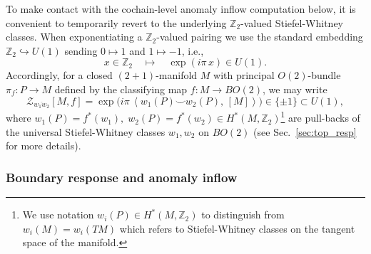 \documentclass[aps,prx,reprint,superscriptaddress,twocolumn,amsmath,amssymb,amsfonts, nofootinbib]{revtex4-2}
\newcommand{\Z}{\mathbb{Z}}
\theoremstyle{apsstyle}
\begin{document}
\medskip

To make contact with the cochain-level anomaly inflow computation below, it is convenient to temporarily revert to the underlying $\Z_2$-valued Stiefel-Whitney classes. When exponentiating a $\Z_2$-valued pairing we use the standard embedding $\Z_2\hookrightarrow U(1)$ sending $0\mapsto 1$ and $1\mapsto -1$, i.e.,
\begin{equation*}
x\in \Z_2
\quad\longmapsto\quad
\exp(i\pi \,x)\in U(1).
\end{equation*}
Accordingly, for a closed $(2{+}1)$-manifold $M$ with  principal $O(2)$-bundle $\pi_f: P\to M$ defined by the classifying map $f:M \to BO(2)$, we may write
\begin{equation}
\mathcal Z_{\overline{w_1w_2}}\left[M, f\right]=
\exp\Big(i\pi \,\left\langle w_1(P)\smile w_2(P),\,[M]\right\rangle\Big)
\in \{\pm1\}\subset U(1),
\label{eq:Z2_to_U1_embedding}
\end{equation}
where $w_{1}(P)=f^{*}(w_{1}),\; w_{2}(P)=f^{*}(w_{2}) \in H^{*}(M, \Z_{2})$\footnote{We use notation $w_{i}(P)\in H^{*}(M,\Z_{2})$ to distinguish from $w_{i}(M)=w_{i}(TM)$ which refers to Stiefel-Whitney classes on the tangent space of the manifold.} are pull-backs of the universal Stiefel-Whitney classes $w_{1},w_{2}$ on $BO(2)$ (see Sec.~\ref{sec:top_resp} for more details).


\subsubsection{Boundary response and anomaly inflow}
\label{sec:example_1_grav}
\end{document}
